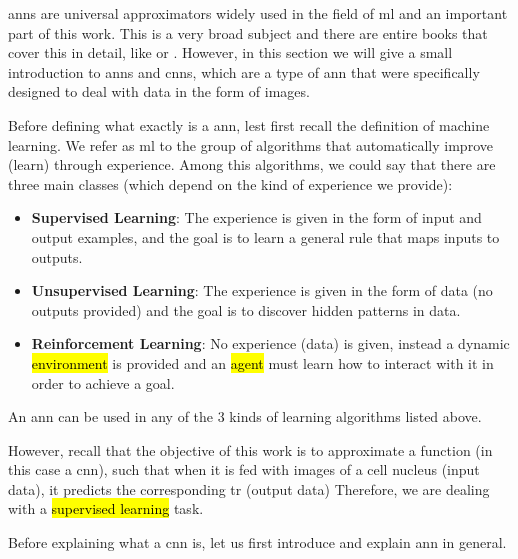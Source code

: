 
\glsresetall

\graphicspath{{./Sections/Basics/Resources/}}

\glspl{ann} are universal approximators widely used in the field of \gls{ml} and an important part of this work. This is a very broad subject and there are entire books that cover this in detail, like  \cite{Goodfellow-et-al-2016} or \cite{bishop2006pattern}. However, in this section we will give a small introduction to \glspl{ann} and \glspl{cnn}, which are a type of \gls{ann} that were specifically designed to deal with data in the form of images.

Before defining what exactly is a \gls{ann}, lest first recall the definition of machine learning. We refer as \gls{ml} to the group of algorithms that automatically improve (learn) through experience. Among this algorithms, we could say that there are three main classes (which depend on the kind of experience we provide):

\begin{itemize}
  \item \textbf{Supervised Learning}: The experience is given in the form of input and output examples, and the goal is to learn a general rule that maps inputs to outputs.
  \item \textbf{Unsupervised Learning}: The experience is given in the form of data (no outputs provided) and the goal is to discover hidden patterns in data.
  \item \textbf{Reinforcement Learning}: No experience (data) is given, instead a dynamic \hl{environment} is provided and an \hl{agent} must learn how to interact with it in order to achieve a goal.
\end{itemize}

An \gls{ann} can be used in any of the 3 kinds of learning algorithms listed above.

However, recall that the objective of this work is to approximate a function (in this case a \gls{cnn}), such that when it is fed with images of a cell nucleus (input data), it predicts the corresponding \gls{tr} (output data) Therefore, we are dealing with a \hl{supervised learning} task.

Before explaining what a \gls{cnn} is, let us first introduce and explain \gls{ann} in general.
